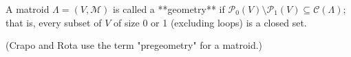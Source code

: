 A matroid $\Lambda = (V, \mathcal{M})$ is called a **geometry** if $\mathcal{P}_0(V) \setminus \mathcal{P}_1(V) \subseteq \mathcal{C}(\Lambda)$; that is, every subset of $V$ of size 0 or 1 (excluding loops) is a closed set.

(Crapo and Rota use the term "pregeometry" for a matroid.)
